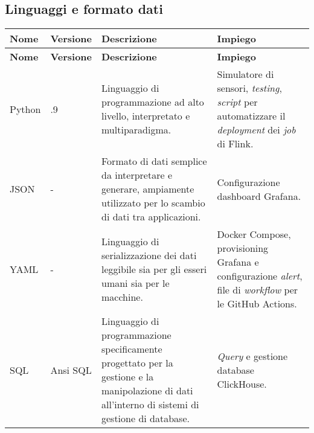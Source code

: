 \subsection{Linguaggi e formato dati}
\begin{longtable}{|>{\centering\arraybackslash}m{}|>{\centering\arraybackslash}m{}|>{\centering\arraybackslash}m{}|>{\centering\arraybackslash}m{}|}
	\hline
	\textbf{Nome} & \textbf{Versione} & \textbf{Descrizione}                                                                                                                                 & \textbf{Impiego}                                                                                                             \\\hline
	\endfirsthead
	\hline
	\textbf{Nome} & \textbf{Versione} & \textbf{Descrizione}                                                                                                                                 & \textbf{Impiego}                                                                                                             \\\hline
	\endhead
	Python        & 3.11.9            & Linguaggio di programmazione ad alto livello, interpretato e multiparadigma.                                                                         & Simulatore di sensori, \textit{testing}, \textit{script} per automatizzare il \textit{deployment} dei \textit{job} di Flink. \\\hline
	JSON          & -                 & Formato di dati semplice da interpretare e generare, ampiamente utilizzato per lo scambio di dati tra applicazioni.                                  & Configurazione dashboard Grafana.                                                                                            \\\hline
	YAML          & -                 & Linguaggio di serializzazione dei dati leggibile sia per gli esseri umani sia per le macchine.                                                       & Docker Compose, provisioning Grafana e configurazione \textit{alert}, file di \textit{workflow} per le GitHub Actions.       \\\hline
	SQL           & Ansi SQL          & Linguaggio di programmazione specificamente progettato per la gestione e la manipolazione di dati all'interno di sistemi di gestione di database.    & \textit{Query} e gestione database ClickHouse.                                                                               \\\hline

\end{longtable}
